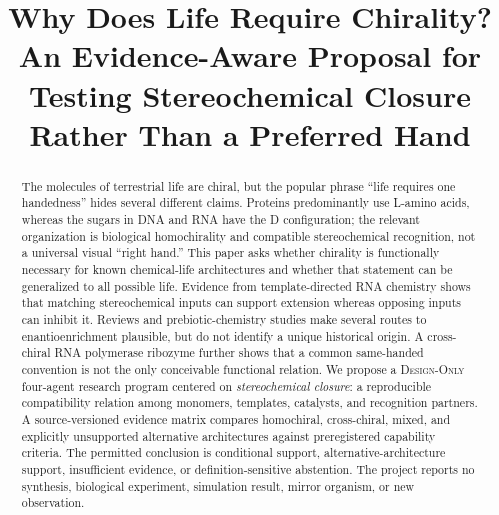 \documentclass[conference]{IEEEtran}
\newcommand{\designonly}{\textsc{Design-Only}}
\newcommand{\closure}{\textit{stereochemical closure}}
\begin{document}
\raggedbottom

\title{Why Does Life Require Chirality? An Evidence-Aware Proposal for Testing Stereochemical Closure Rather Than a Preferred Hand}

\author{
}

\maketitle

\begin{abstract}
The molecules of terrestrial life are chiral, but the popular phrase ``life requires one handedness'' hides several different claims. Proteins predominantly use L-amino acids, whereas the sugars in DNA and RNA have the D configuration; the relevant organization is biological homochirality and compatible stereochemical recognition, not a universal visual ``right hand.'' This paper asks whether chirality is functionally necessary for known chemical-life architectures and whether that statement can be generalized to all possible life. Evidence from template-directed RNA chemistry shows that matching stereochemical inputs can support extension whereas opposing inputs can inhibit it. Reviews and prebiotic-chemistry studies make several routes to enantioenrichment plausible, but do not identify a unique historical origin. A cross-chiral RNA polymerase ribozyme further shows that a common same-handed convention is not the only conceivable functional relation. We propose a \designonly{} four-agent research program centered on \closure: a reproducible compatibility relation among monomers, templates, catalysts, and recognition partners. A source-versioned evidence matrix compares homochiral, cross-chiral, mixed, and explicitly unsupported alternative architectures against preregistered capability criteria. The permitted conclusion is conditional support, alternative-architecture support, insufficient evidence, or definition-sensitive abstention. The project reports no synthesis, biological experiment, simulation result, mirror organism, or new observation.
\end{abstract}
\end{document}

